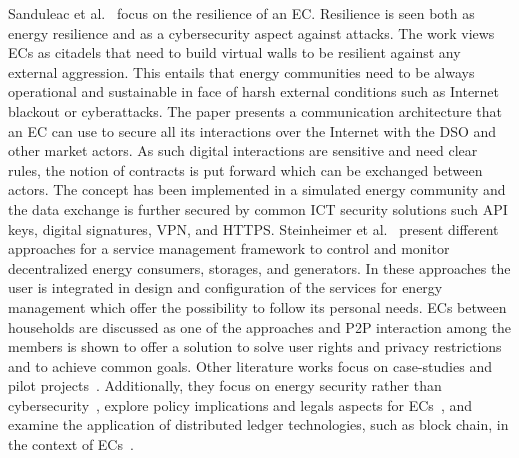 Sanduleac et al.~\cite{ec-resilience} focus on the resilience of an EC. Resilience is seen both as energy resilience and as a cybersecurity aspect against attacks. The work views ECs as citadels that need to build virtual walls to be resilient against any external aggression. This entails that energy communities need to be always operational and sustainable in face of harsh external conditions such as Internet blackout or cyberattacks. The paper presents a communication architecture that an EC can use to secure all its interactions over the Internet with the DSO and other market actors. As such digital interactions are sensitive and need clear rules, the notion of contracts is put forward which can be exchanged between actors. The concept has been implemented in a simulated energy community and the data exchange is further secured by common ICT security solutions such API keys, digital signatures, VPN, and HTTPS. Steinheimer et al.~\cite{ec-p2p1} present different approaches for a service management framework to control and monitor decentralized energy consumers, storages, and generators. In these approaches the user is integrated in design and configuration of the services for energy management which offer the possibility to follow its personal needs. ECs between  households are discussed as one of the approaches and P2P interaction among the members is shown to offer a solution to solve user rights and privacy restrictions and to achieve common goals. Other literature works focus on case-studies and pilot projects~\cite{ec-italian, ec-dutch}. Additionally, they focus on energy security rather than cybersecurity~\cite{ec-energysecurity}, explore policy implications and legals aspects for ECs~\cite{ec-legal1, ec-legal2}, and examine the application of distributed ledger technologies, such as block chain, in the context of ECs~\cite{ec-dlt1, ec-dlt2, ec-dlt3}. 



